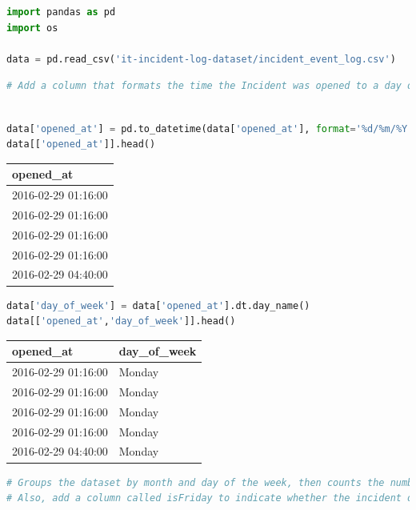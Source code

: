 \documentclass{article}
\begin{document}
\begin{lstlisting}[language=Python, breaklines=true]
import pandas as pd
import os

data = pd.read_csv('it-incident-log-dataset/incident_event_log.csv')

\end{lstlisting}
\begin{lstlisting}[language=Python, breaklines=true]
# Add a column that formats the time the Incident was opened to a day of the week
\end{lstlisting}

\begin{lstlisting}[language=Python, breaklines=true]

data['opened_at'] = pd.to_datetime(data['opened_at'], format='%d/%m/%Y %H:%M', errors='coerce')
data[['opened_at']].head()    
\end{lstlisting}
\begin{table}[H]
\centering
\begin{flushleft}
\begin{tabular}{|l|}
\hline
\textbf{opened\_at} \\
\hline
2016-02-29 01:16:00 \\
2016-02-29 01:16:00 \\
2016-02-29 01:16:00 \\
2016-02-29 01:16:00 \\
2016-02-29 04:40:00 \\
\hline
\end{tabular}
\end{flushleft}
\end{table}

\begin{lstlisting}[language=Python]
data['day_of_week'] = data['opened_at'].dt.day_name()
data[['opened_at','day_of_week']].head()
\end{lstlisting}

\begin{table}[H]
\centering
\begin{flushleft}
\begin{tabular}{|l|l|}
\hline
\textbf{opened\_at} & \textbf{day\_of\_week} \\
\hline
2016-02-29 01:16:00 & Monday \\
2016-02-29 01:16:00 & Monday \\
2016-02-29 01:16:00 & Monday \\
2016-02-29 01:16:00 & Monday \\
2016-02-29 04:40:00 & Monday \\
\hline
\end{tabular}
\end{flushleft}
\end{table}
\begin{lstlisting}[language=Python, breaklines=true]
# Groups the dataset by month and day of the week, then counts the number of incidents for each combination, returning the result in a new DataFrame with an incident_count column. 
# Also, add a column called isFriday to indicate whether the incident occurred on a Friday.
\end{lstlisting}
\end{document}
